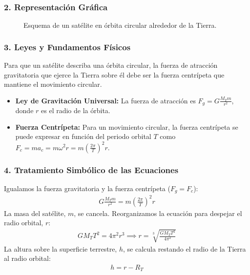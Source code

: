 \subsubsection*{2. Representación Gráfica}
\begin{figure}[H]
    \centering
    \caption{Esquema de un satélite en órbita circular alrededor de la Tierra.}
\end{figure}

\subsubsection*{3. Leyes y Fundamentos Físicos}
Para que un satélite describa una órbita circular, la fuerza de atracción gravitatoria que ejerce la Tierra sobre él debe ser la fuerza centrípeta que mantiene el movimiento circular.
\begin{itemize}
    \item \textbf{Ley de Gravitación Universal:} La fuerza de atracción es $F_g = G \frac{M_T m}{r^2}$, donde $r$ es el radio de la órbita.
    \item \textbf{Fuerza Centrípeta:} Para un movimiento circular, la fuerza centrípeta se puede expresar en función del periodo orbital $T$ como $F_c = m a_c = m \omega^2 r = m \left(\frac{2\pi}{T}\right)^2 r$.
\end{itemize}

\subsubsection*{4. Tratamiento Simbólico de las Ecuaciones}
Igualamos la fuerza gravitatoria y la fuerza centrípeta ($F_g = F_c$):
\begin{gather}
    G \frac{M_T m}{r^2} = m \left(\frac{2\pi}{T}\right)^2 r
\end{gather}
La masa del satélite, $m$, se cancela. Reorganizamos la ecuación para despejar el radio orbital, $r$:
\begin{gather}
    G M_T T^2 = 4\pi^2 r^3 \implies r = \sqrt[3]{\frac{G M_T T^2}{4\pi^2}}
\end{gather}
La altura sobre la superficie terrestre, $h$, se calcula restando el radio de la Tierra al radio orbital:
\begin{gather}
    h = r - R_T
\end{gather}

